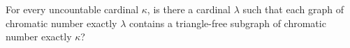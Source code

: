 For every uncountable cardinal $\kappa$, is there a cardinal $\lambda$ such that each graph of chromatic number exactly $\lambda$ contains a triangle-free subgraph of chromatic number exactly $\kappa$?
